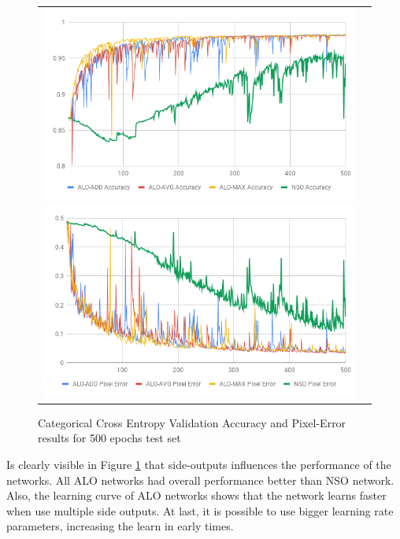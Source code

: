 \begin{figure}
  \caption{Categorical Cross Entropy Validation Accuracy and Pixel-Error results for 500 epochs test set}
  \centering
  \begin{tabular}{ll}
    \includegraphics[width=1.\columnwidth]{figures/falreis/val_acc_500_epochs.png}
  
    \includegraphics[width=1.\columnwidth]{figures/falreis/pixel_error_500_epochs.png}
  \end{tabular}%
  \label{fig:val_acc_500_epochs}
\end{figure}

Is clearly visible in Figure \ref{fig:val_acc_500_epochs} that side-outputs influences the performance of the networks. All ALO networks had overall performance better than NSO network. Also, the learning curve of ALO networks shows that the network learns faster when use multiple side outputs. At last, it is possible to use bigger learning rate parameters, increasing the learn in early times.

